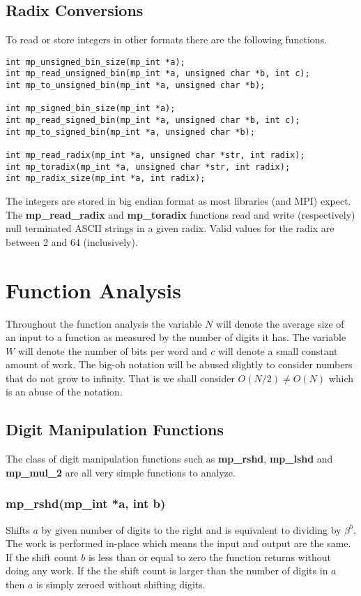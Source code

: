 \documentclass{article}
\begin{document}
\subsection{Radix Conversions}
To read or store integers in other formats there are the following functions.

\begin{verbatim}
int mp_unsigned_bin_size(mp_int *a);
int mp_read_unsigned_bin(mp_int *a, unsigned char *b, int c);
int mp_to_unsigned_bin(mp_int *a, unsigned char *b);

int mp_signed_bin_size(mp_int *a);
int mp_read_signed_bin(mp_int *a, unsigned char *b, int c);
int mp_to_signed_bin(mp_int *a, unsigned char *b);

int mp_read_radix(mp_int *a, unsigned char *str, int radix);
int mp_toradix(mp_int *a, unsigned char *str, int radix);
int mp_radix_size(mp_int *a, int radix);
\end{verbatim}

The integers are stored in big endian format as most libraries (and MPI) expect.  The \textbf{mp\_read\_radix} and 
\textbf{mp\_toradix} functions read and write (respectively) null terminated ASCII strings in a given radix.  Valid values
for the radix are between 2 and 64 (inclusively).  

\section{Function Analysis}

Throughout the function analysis the variable $N$ will denote the average size of an input to a function as measured 
by the number of digits it has.  The variable $W$ will denote the number of bits per word and $c$ will denote a small
constant amount of work.  The big-oh notation will be abused slightly to consider numbers that do not grow to infinity.
That is we shall consider $O(N/2) \ne O(N)$ which is an abuse of the notation.

\subsection{Digit Manipulation Functions}
The class of digit manipulation functions such as \textbf{mp\_rshd}, \textbf{mp\_lshd} and \textbf{mp\_mul\_2} are all
very simple functions to analyze.  

\subsubsection{mp\_rshd(mp\_int *a, int b)}
Shifts $a$ by given number of digits to the right and is equivalent to dividing by $\beta^b$.  The work is performed
in-place which means the input and output are the same.  If the shift count $b$ is less than or equal to zero 
the function returns without doing any work.  If the the shift count is larger than the number of digits in $a$ 
then $a$ is simply zeroed without shifting digits.
\end{document}

